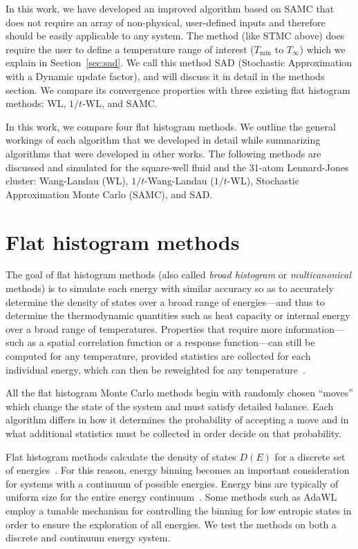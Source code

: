 \documentclass[letterpaper,twocolumn,amsmath,amssymb,pre,aps,10pt]{revtex4-1}
\begin{document}
In this work, we have developed an improved algorithm based on SAMC that does
not require an array of non-physical, user-defined inputs and therefore should
be easily applicable to any system. The method (like STMC above) does require
the user to define a temperature range of interest ($T_\text{min}$ to
$T_\infty$) which we explain in Section~\ref{sec:sad}.  We call this method SAD (Stochastic Approximation with a Dynamic
update factor), and will discuss it in detail in the methods section. We compare
its convergence properties with three existing flat histogram methods: WL,
$1/t$-WL, and SAMC.

In this work, we compare four flat histogram methods.  We outline the
general workings of each algorithm that we developed in detail while
summarizing algorithms that were developed in other works.  The
following methods are discussed and simulated for the square-well
fluid and the 31-atom Lennard-Jones cluster: Wang-Landau (WL),
$1/t$-Wang-Landau ($1/t$-WL), Stochastic Approximation Monte Carlo
(SAMC), and SAD.

\section{Flat histogram methods}\label{sec:histogram}
The goal of flat histogram methods (also called \emph{broad histogram}
or \emph{multicanonical} methods) is to simulate each energy with
similar accuracy so as to accurately determine the density of states
over a broad range of energies---and thus to determine the thermodynamic
quantities such as heat capacity or internal energy
over a broad range of temperatures.
Properties that require more information---such as a spatial
correlation function or a response function---can still be computed
for any temperature, provided statistics are collected for each
individual energy, which can then be reweighted for any
temperature~\cite{panagiotopoulos1998phase, panagiotopoulos2000monte,
errington2003direct}.

All the flat histogram Monte Carlo methods begin with randomly chosen
``moves'' which change the state of the system and must satisfy
detailed balance.  Each algorithm differs in how it determines the
probability of accepting a move and in what additional statistics must
be collected in order decide on that probability.

Flat histogram methods calculate the density of states $D(E)$ for a discrete set
of energies~\cite{wang2001determining, dayal2004performance, troyer2003flat,
trebst2004optimizing}. For this reason, energy binning becomes an important
consideration for systems with a continuum of possible energies.  Energy bins
are typically of uniform size for the entire energy
continuum~\cite{fasnacht2004adaptive}. Some methods such as
AdaWL~\cite{koh2013dynamically} employ a tunable mechanism for controlling the
binning for low entropic states in order to ensure the exploration of all
energies.  We test the methods on both a discrete and continuum energy system.
\end{document}
